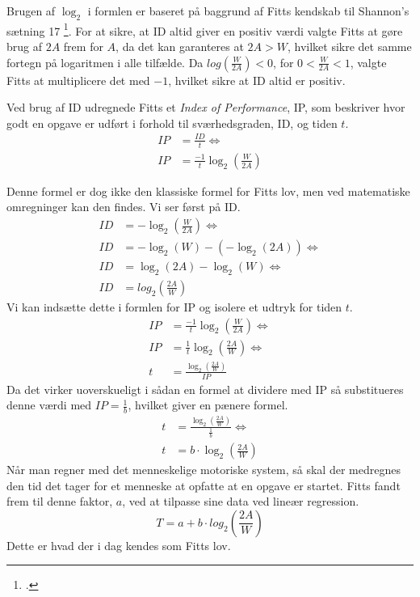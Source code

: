 Brugen af $\log_2$ i formlen er baseret på baggrund af Fitts kendskab til Shannon's sætning 17 \footcite{goldberg2015}. For at sikre, at ID altid giver en positiv værdi valgte Fitts at gøre brug af $2A$ frem for $A$, da det kan garanteres at $2A > W$, hvilket sikre det samme fortegn på logaritmen i alle tilfælde. Da $log\left(\frac{W}{2A}\right)<0$, for $0<\frac{W}{2A}<1$, valgte Fitts at multiplicere det med $-1$, hvilket sikre at ID altid er positiv.

Ved brug af ID udregnede Fitts et \textit{Index of Performance}, IP, som beskriver hvor godt en opgave er udført i forhold til sværhedsgraden, ID, og tiden $t$.
\begin{align*}
IP &= \frac{ID}{t}\Leftrightarrow\\
IP &= \frac{-1}{t}\log_2\left(\frac{W}{2A}\right)
\end{align*}

Denne formel er dog ikke den klassiske formel for Fitts lov, men ved matematiske omregninger kan den findes. Vi ser først på ID.
\begin{align*}
ID &= -\log_2\left(\frac{W}{2A}\right) \Leftrightarrow\\
ID &= -\log_2\left(W\right)-\left(-\log_2\left(2A\right)\right) \Leftrightarrow\\
ID &= \log_2\left(2A\right)-\log_2\left(W\right) \Leftrightarrow\\
ID &= log_2\left(\frac{2A}{W}\right)
\end{align*}
Vi kan indsætte dette i formlen for IP og isolere et udtryk for tiden $t$.
\begin{align*}
IP &=\frac{-1}{t}\log_2\left(\frac{W}{2A}\right) \Leftrightarrow\\ 
IP &= \frac{1}{t}\log_2\left(\frac{2A}{W}\right) \Leftrightarrow\\ 
t &= \frac{\log_2\left(\frac{2A}{W}\right)}{IP}
\end{align*}
Da det virker uoverskueligt i sådan en formel at dividere med IP så substitueres denne værdi med $IP = \frac{1}{b}$, hvilket giver en pænere formel.
\begin{align*}
t &= \frac{\log_2\left(\frac{2A}{W}\right)}{\frac{1}{b}} \Leftrightarrow\\ 
t &= b \cdot \log_2\left(\frac{2A}{W}\right)
\end{align*}
Når man regner med det menneskelige motoriske system, så skal der medregnes den tid det tager for et menneske at opfatte at en opgave er startet. Fitts fandt frem til denne faktor, $a$, ved at tilpasse sine data ved lineær regression.
\begin{equation}
\label{eq:FittsLov}
T = a + b \cdot log_2\left(\frac{2A}{W}\right)
\end{equation}
Dette er hvad der i dag kendes som Fitts lov.

